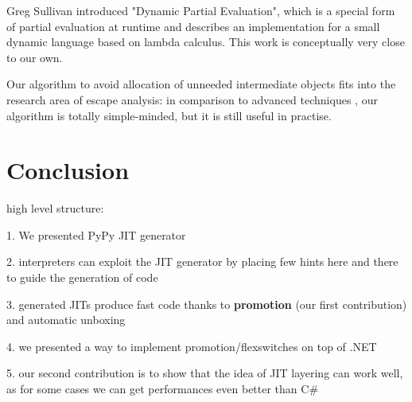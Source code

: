 Greg Sullivan introduced "Dynamic Partial Evaluation", which is a special
form of partial evaluation at runtime \cite{sullivan_dynamic_2001} and describes
an implementation for a small dynamic language based on lambda calculus. This
work is conceptually very close to our own.

Our algorithm to avoid allocation of unneeded intermediate objects fits into
the research area of escape analysis: in comparison to advanced techniques
\cite{Blanchet99escapeanalysis}, \cite{Choi99escapeanalysis} our algorithm is
totally simple-minded, but it is still useful in practise.

\section{Conclusion}

high level structure:

1. We presented PyPy JIT generator 

2. interpreters can exploit the JIT generator by placing few hints here and
there to guide the generation of code

3. generated JITs produce fast code thanks to \textbf{promotion} (our first
contribution) and automatic unboxing

4. we presented a way to implement promotion/flexswitches on top of .NET

5. our second contribution is to show that the idea of JIT layering can work
well, as for some cases we can get performances even better than C\#
